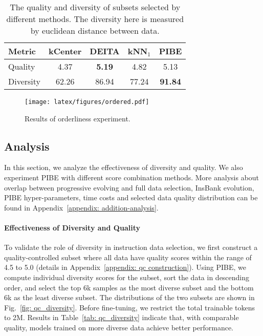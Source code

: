 \begin{table}[htbp]
    \centering
    \small
    \begin{tabular}{lcccc}
    \toprule
     Metric & kCenter & DEITA &  kNN$_1$ & PIBE \\
    \midrule
    Quality & 4.37 & \textbf{5.19} & 4.82 & 5.13 \\
    Diversity & 62.26 & 86.94 & 77.24 & \textbf{91.84} \\
    \bottomrule
\end{tabular}
\caption{The quality and diversity of subsets selected by different methods. The diversity here is measured by euclidean distance between data.}
\label{tab: main-subset-statistics}
\end{table}

\begin{figure}[hbtp]
\begin{center}
\texttt{[image: latex/figures/ordered.pdf]}
\end{center}
\caption{Results of orderliness experiment.}
\label{fig: results-ordering}
\end{figure}

\subsection{Analysis}

In this section, we analyze the effectiveness of diversity and quality. We also experiment PIBE with different score combination methods. More analysis about overlap between progressive evolving and full data selection, InsBank evolution, PIBE hyper-parameters, time costs and selected data quality distribution can be found in Appendix~\ref{appendix: addition-analysis}.

\paragraph{\textbf{Effectiveness of Diversity and Quality}}

To validate the role of diversity in instruction data selection, we first construct a quality-controlled subset where all data have quality scores within the range of 4.5 to 5.0 (details in Appendix~\ref{appendix: qc construction}). Using PIBE, we compute individual diversity scores for the subset, sort the data in descending order, and select the top 6k samples as the most diverse subset and the bottom 6k as the least diverse subset. The distributions of the two subsets are shown in Fig.~\ref{fig: qc_diversity}. Before fine-tuning, we restrict the total trainable tokens to 2M. Results in Table~\ref{tab: qc_diversity} indicate that, with comparable quality, models trained on more diverse data achieve better performance.

